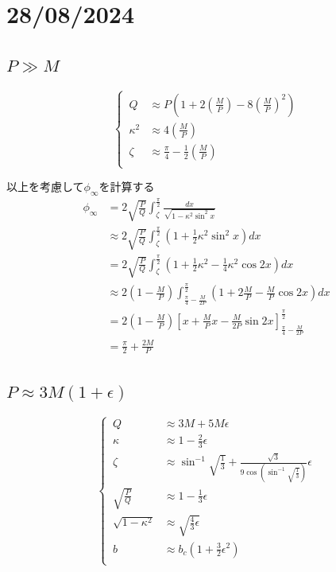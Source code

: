 \documentclass[dvipdfmx]{report} %
\begin{document}
\chapter{28/08/2024}

\section{$P \gg M$}

\begin{equation*}
\left\{ \,
\begin{aligned}
	Q &\approx P \left( 1 + 2\left( \frac{M}{P} \right) - 8\left( \frac{M}{P} \right)^2 \right)\\
	\kappa^2 &\approx 4\left( \frac{M}{P} \right)\\
	\zeta &\approx \frac{\pi}{4} - \frac{1}{2} \left( \frac{M}{P} \right)\\
\end{aligned}
\right.
\end{equation*}

以上を考慮して$\phi_{\infty}$を計算する
\begin{equation*}
\begin{split}
	\phi_{\infty} &= 2\sqrt{ \frac{P}{Q} } \int^{\frac{\pi}{2}}_{\zeta} \frac{ dx }{\sqrt{ 1 - \kappa^2 \sin^2 x }}\\
	&\approx 2\sqrt{ \frac{P}{Q} } \int^{\frac{\pi}{2}}_{\zeta} \left( 1 + \frac{1}{2}\kappa^2 \sin^2 x \right) dx\\
	&= 2\sqrt{ \frac{P}{Q} } \int^{\frac{\pi}{2}}_{\zeta} \left( 1 + \frac{1}{2}\kappa^2 - \frac{1}{4}\kappa^2 \cos 2x \right) dx\\
	&\approx 2\left( 1 - \frac{M}{P} \right)\int^{\frac{\pi}{2}}_{\frac{\pi}{4} - \frac{M}{2P}} \left( 1 + 2\frac{M}{P} - \frac{M}{P} \cos 2x \right)dx\\
	&= 2\left( 1 - \frac{M}{P} \right) \left[ x + \frac{M}{P}x - \frac{M}{2P} \sin 2x\right]^{\frac{\pi}{2}}_{\frac{\pi}{4} - \frac{M}{2P}}\\
	&= \frac{\pi}{2} + \frac{2M}{P}
\end{split}
\end{equation*}

\section{$P \approx 3M( 1 + \epsilon )$}

\begin{equation*}
\left\{ \,
\begin{aligned}
	Q &\approx 3M + 5M\epsilon\\
	\kappa &\approx 1 - \frac{2}{3}\epsilon\\
	\zeta &\approx \sin^{-1} \sqrt{ \frac{1}{3} } + \frac{\sqrt{3}}{9\cos \left( \sin^{-1} \sqrt{ \frac{1}{3} } \right) }\epsilon\\
	\sqrt{ \frac{P}{Q} } &\approx 1 - \frac{1}{3}\epsilon\\
	\sqrt{ 1 - \kappa^2 } &\approx \sqrt{ \frac{4}{3} \epsilon }\\
	b &\approx b_c \left( 1 + \frac{3}{2}\epsilon^2 \right)\\
\end{aligned}
\right.
\end{equation*}
\end{document}
